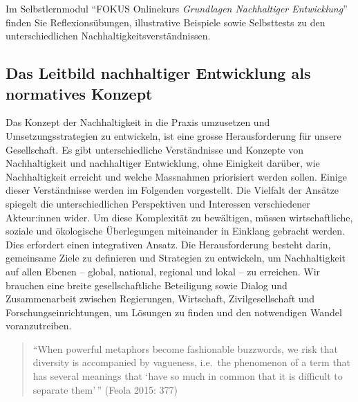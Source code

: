 \documentclass[
  letterpaper,
  DIV=11,
  numbers=noendperiod]{scrartcl}
\begin{document}
\begin{tcolorbox}[enhanced jigsaw, opacitybacktitle=0.6, breakable, left=2mm, colback=white, leftrule=.75mm, colbacktitle=quarto-callout-caution-color!10!white, bottomrule=.15mm, toprule=.15mm, titlerule=0mm, title=\textcolor{quarto-callout-caution-color}{\faFire}\hspace{0.5em}{(Reflexions)übungen und Beispiele}, colframe=quarto-callout-caution-color-frame, bottomtitle=1mm, opacityback=0, arc=.35mm, toptitle=1mm, rightrule=.15mm, coltitle=black]

Im Selbstlernmodul ``FOKUS Onlinekurs \emph{Grundlagen Nachhaltiger
Entwicklung}'' finden Sie Reflexionsübungen, illustrative Beispiele
sowie Selbsttests zu den unterschiedlichen
Nachhaltigkeitsverständnissen.

\end{tcolorbox}

\subsection{Das Leitbild nachhaltiger Entwicklung als normatives
Konzept}\label{das-leitbild-nachhaltiger-entwicklung-als-normatives-konzept}

Das Konzept der Nachhaltigkeit in die Praxis umzusetzen und
Umsetzungsstrategien zu entwickeln, ist eine grosse Herausforderung für
unsere Gesellschaft. Es gibt unterschiedliche Verständnisse und Konzepte
von Nachhaltigkeit und nachhaltiger Entwicklung, ohne Einigkeit darüber,
wie Nachhaltigkeit erreicht und welche Massnahmen priorisiert werden
sollen. Einige dieser Verständnisse werden im Folgenden vorgestellt. Die
Vielfalt der Ansätze spiegelt die unterschiedlichen Perspektiven und
Interessen verschiedener Akteur:innen wider. Um diese Komplexität zu
bewältigen, müssen wirtschaftliche, soziale und ökologische Überlegungen
miteinander in Einklang gebracht werden. Dies erfordert einen
integrativen Ansatz. Die Herausforderung besteht darin, gemeinsame Ziele
zu definieren und Strategien zu entwickeln, um Nachhaltigkeit auf allen
Ebenen -- global, national, regional und lokal -- zu erreichen. Wir
brauchen eine breite gesellschaftliche Beteiligung sowie Dialog und
Zusammenarbeit zwischen Regierungen, Wirtschaft, Zivilgesellschaft und
Forschungseinrichtungen, um Lösungen zu finden und den notwendigen
Wandel voranzutreiben.

\begin{quote}
``When powerful metaphors become fashionable buzzwords, we risk that
diversity is accompanied by vagueness, i.e.~the phenomenon of a term
that has several meanings that `have so much in common that it is
difficult to separate them'\,'' (Feola 2015: 377)
\end{quote}
\end{document}
